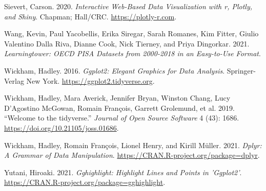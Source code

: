 \begin{CSLReferences}{1}{0}
\leavevmode{}%
Sievert, Carson. 2020. \emph{Interactive Web-Based Data Visualization with r, Plotly, and Shiny}. Chapman; Hall/CRC. \url{https://plotly-r.com}.

\leavevmode{}%
Wang, Kevin, Paul Yacobellis, Erika Siregar, Sarah Romanes, Kim Fitter, Giulio Valentino Dalla Riva, Dianne Cook, Nick Tierney, and Priya Dingorkar. 2021. \emph{Learningtower: OECD PISA Datasets from 2000-2018 in an Easy-to-Use Format}.

\leavevmode{}%
Wickham, Hadley. 2016. \emph{Ggplot2: Elegant Graphics for Data Analysis}. Springer-Verlag New York. \url{https://ggplot2.tidyverse.org}.

\leavevmode{}%
Wickham, Hadley, Mara Averick, Jennifer Bryan, Winston Chang, Lucy D'Agostino McGowan, Romain François, Garrett Grolemund, et al. 2019. {``Welcome to the {tidyverse}.''} \emph{Journal of Open Source Software} 4 (43): 1686. \url{https://doi.org/10.21105/joss.01686}.

\leavevmode{}%
Wickham, Hadley, Romain François, Lionel Henry, and Kirill Müller. 2021. \emph{Dplyr: A Grammar of Data Manipulation}. \url{https://CRAN.R-project.org/package=dplyr}.

\leavevmode{}%
Yutani, Hiroaki. 2021. \emph{Gghighlight: Highlight Lines and Points in 'Ggplot2'}. \url{https://CRAN.R-project.org/package=gghighlight}.

\end{CSLReferences}



\address{%
Priya Ravindra Dingorkar\\
Monash University\\%
Department of Econometrics and Business Statistics\\ Clayton, Australia\\
%
\url{https://www.linkedin.com/in/priya-dingorkar/}\\%
%
\href{mailto:priyadingorkar@gmail.com}{\nolinkurl{priyadingorkar@gmail.com}}%
}

\address{%
Kevin Y.X. Wang\\
University of Sydney\\%
School of Mathematics and Statistics\\ Sydney, Australia\\
%
\url{https://kevinwang09.github.io/}\\%
%
\href{mailto:kevinwangstats@gmail.com}{\nolinkurl{kevinwangstats@gmail.com}}%
}

\address{%
Dianne Cook\\
Monash University\\%
Department of Econometrics and Business Statistics\\ Clayton, Australia\\
%
\url{http://dicook.org/}\\%
%
\href{mailto:dicook@monash.edu}{\nolinkurl{dicook@monash.edu}}%
}
